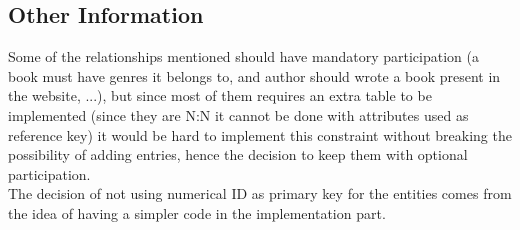 \subsection{Other Information}


Some of the relationships mentioned should have mandatory participation (a book must have genres it belongs to, and author should wrote a book present in the website, ...), but since most of them requires an extra table to be implemented (since they are N:N it cannot be done with attributes used as reference key) it would be hard to implement this constraint without breaking the possibility of adding entries, hence the decision to keep them with optional participation.\\
The decision of not using numerical ID as primary key for the entities comes from the idea of having a simpler code in the implementation part.